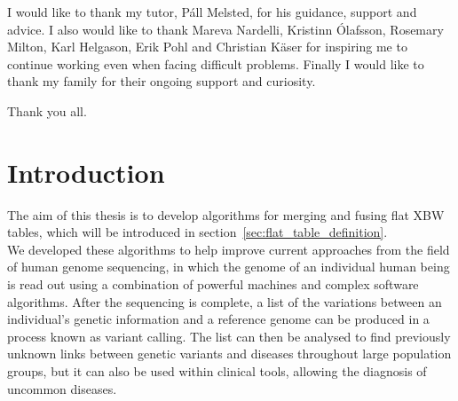 \documentclass[a4paper,12pt,twoside,BCOR=10mm]{scrbook}
\begin{document}
%
%
%
%
%

I would like to thank my tutor, Páll Melsted, for his guidance, support and advice.
I also would like to thank Mareva Nardelli, Kristinn Ólafsson, Rosemary Milton, 
Karl Helgason, Erik Pohl and Christian Käser
for inspiring me to continue working even when facing difficult problems.
Finally I would like to thank my family for their ongoing support and curiosity.

Thank you all.

\chapter{Introduction}
\setcounter{page}{1}


The aim of this thesis is to develop algorithms for merging and fusing flat XBW tables,
which will be introduced in section~\ref{sec:flat_table_definition}. \\
We developed these algorithms to help improve current approaches from the field of human genome sequencing,
in which the genome of an individual human being is read out using a combination of
powerful machines and complex software algorithms.
After the sequencing is complete, a list of the variations between an individual's genetic information
and a reference genome can be produced in a process known as variant calling.
The list can then be analysed to find previously unknown links between genetic variants and
diseases throughout large population groups, but it can also be used within clinical tools, allowing the
diagnosis of uncommon diseases.
\end{document}
